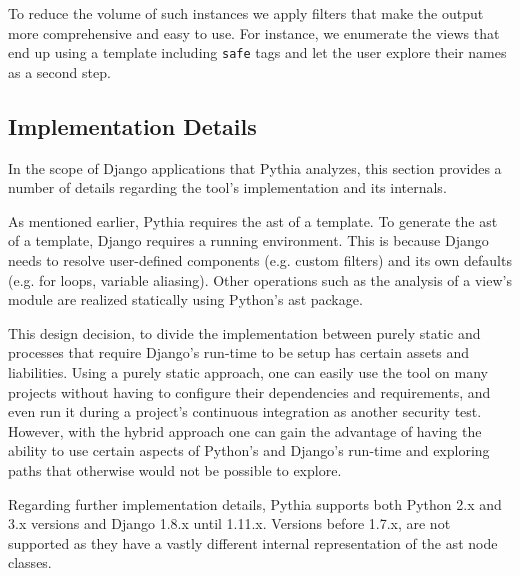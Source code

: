 To reduce the volume of such instances
we apply filters that make the output
more comprehensive and easy to use.
For instance,
we enumerate the views that end up
using a template including {\tt safe} tags
and let the user explore their names as a
second step.

\subsection{Implementation Details}
\label{sec:implementation}

In the scope of Django applications that 
Pythia analyzes, this section provides 
a number of details regarding
the tool's implementation and its internals.

As mentioned earlier, Pythia requires the {\sc ast} of a
template. To generate the {\sc ast} of a template,
Django requires a running environment.
This is because Django needs to resolve
user-defined components (e.g. custom filters)
and its own defaults (e.g. for loops, variable aliasing).
Other operations such as the analysis of a view's
module are realized statically using Python's
{\sc ast} package.

This design decision, to divide the implementation
between purely static and processes that require
Django's run-time to be setup has certain
assets and liabilities.
Using a purely static approach,
one can easily use the tool on many projects
without having to configure their dependencies
and requirements,
and even run it during a project's continuous
integration as another security test.
However,
with the hybrid approach one can gain the
advantage of having the ability to use
certain aspects of Python's and Django's
run-time and exploring paths that
otherwise would not be possible to explore. 

Regarding further implementation details, 
Pythia supports both Python 2.x and 3.x
versions and Django 1.8.x until 1.11.x. Versions 
before 1.7.x, are not supported as they have a
vastly different internal representation
of the {\sc ast} node classes.
